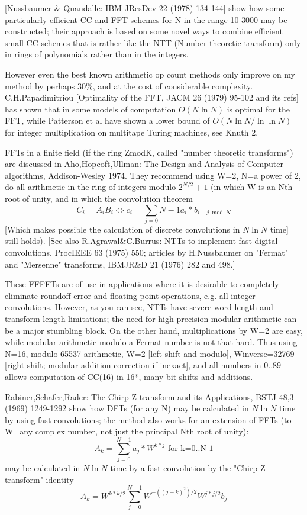 [Nussbaumer \& Quandalle: IBM JResDev 22 (1978) 134-144] show how some
particularly efficient CC and FFT schemes for N in the range 10-3000
may be constructed; their approach is based on some novel ways to combine
efficient small CC schemes that is rather like the NTT (Number theoretic
transform) only in rings of polynomials rather than in the integers.

However even the best known arithmetic op count methods only improve on my
method by perhaps 30\%, and at the cost of considerable complexity.
C.H.Papadimitriou [Optimality of the FFT, JACM 26 (1979) 95-102 and its refs]
has shown that in some models of computation $O(N\ln N)$ is
optimal for the FFT, while Patterson et al have shown a lower
bound of $O(N\ln N/\ln \ln N)$ for integer multiplication on multitape
Turing machines, see Knuth 2.

FFTs in a finite field (if the ring ZmodK, called "number theoretic
transforms") are discussed in Aho,Hopcoft,Ullman: The Design and Analysis
of Computer algorithms, Addison-Wesley 1974. They recommend using W=2,
N=a power of 2, do all arithmetic in the ring of integers 
modulo $2^{N/2}+1$
(in which W is an Nth root of unity, and in which the convolution theorem
\begin{equation}
    C_i=A_iB_i  \Longleftrightarrow   
         c_i = \sum_{j=0}{N-1} a_i*b_{i-j \bmod N}
\end{equation}
[Which makes possible the calculation of discrete convolutions in $N\ln N$ time]
still holds). [See also R.Agrawal\&C.Burrus: NTTs to implement fast digital
convolutions, ProcIEEE 63 (1975) 550; articles by H.Nussbaumer on "Fermat"
and "Mersenne" transforms, IBMJR\&D 21 (1976) 282 and 498.]

These FFFFTs are of use in applications where it is desirable
to completely eliminate roundoff error and floating point operations,
e.g. all-integer convolutions. However, as you can see, NTTs have severe
word length and transform length limitations; the need for high precision
modular arithmetic can be a major stumbling block. On the other hand,
multiplications by W=2 are easy, while modular arithmetic modulo a
Fermat number is not that hard. Thus using N=16, modulo 65537 arithmetic,
W=2 [left shift and modulo], Winverse=32769 [right shift; modular
addition correction if inexact], and all numbers in 0..89 allows
computation of CC(16) in 16*, many bit shifts and additions.

Rabiner,Schafer,Rader: The Chirp-Z transform and its Applications,
BSTJ 48,3 (1969) 1249-1292 show how DFTs (for any N) may be calculated in
$N\ln N$ time by using fast convolutions; the method also works for an extension
of FFTs (to W=any complex number, not just the principal Nth root of unity):
\begin{equation}
    A_k  =  \sum_{j=0}^{N-1}a_j*W^{k*j}  \mbox{ for k=0..N-1}
\end{equation}
may be calculated in $N\ln N$ time by a fast convolution by the "Chirp-Z
transform" identity
\begin{equation}
    A_k  = W^{k*k/2} \sum_{j=0}^{N-1} W^{-((j-k)^2)/2} W^{j*j/2}b_j
\end{equation}

